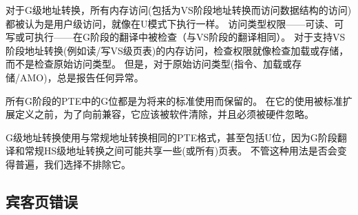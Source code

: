 对于G级地址转换，所有内存访问(包括为VS阶段地址转换而访问数据结构的访问)都被认为是用户级访问，就像在U模式下执行一样。
访问类型权限——可读、可写或可执行——在G阶段的翻译中被检查（与VS阶段的翻译相同）。
对于支持VS阶段地址转换(例如读/写VS级页表)的内存访问，检查权限就像检查加载或存储，而不是检查原始访问类型。
但是，对于原始访问类型(指令、加载或存储/AMO)，总是报告任何异常。

所有G阶段的PTE中的G位都是为将来的标准使用而保留的。
在它的使用被标准扩展定义之前，为了向前兼容，它应该被软件清除，并且必须被硬件忽略。

\begin{commentary}

  G级地址转换使用与常规地址转换相同的PTE格式，甚至包括U位，因为G阶段翻译和常规HS级地址转换之间可能共享一些(或所有)页表。
  不管这种用法是否会变得普遍，我们选择不排除它。
\end{commentary}

\subsection{宾客页错误}

